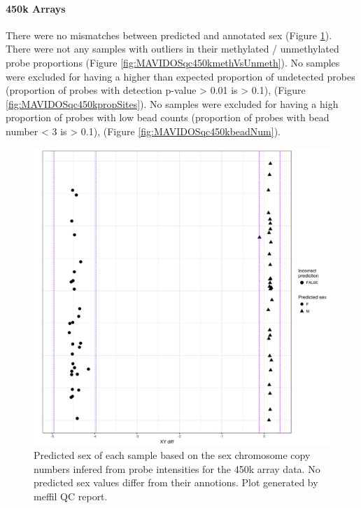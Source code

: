 \documentclass[
]{book}
\begin{document}
\hypertarget{k-arrays}{%
\paragraph{450k Arrays}\label{k-arrays}}

There were no mismatches between predicted and annotated sex (Figure \ref{fig:MAVIDOSqc450ksexMismatch}).
There were not any samples with outliers in their methylated / unmethylated probe proportions (Figure \ref{fig:MAVIDOSqc450kmethVsUnmeth}).
No samples were excluded for having a higher than expected proportion of undetected probes (proportion of probes with detection p-value \textgreater{} 0.01 is \textgreater{} 0.1), (Figure \ref{fig:MAVIDOSqc450kpropSites}).
No samples were excluded for having a high proportion of probes with low bead counts (proportion of probes with bead number \textless{} 3 is \textgreater{} 0.1), (Figure \ref{fig:MAVIDOSqc450kbeadNum}).

\begin{figure}

{\centering \includegraphics[width=0.8\linewidth]{figs/MAVIDOSqc450ksexMismatch} 

}

\caption{Predicted sex of each sample based on the sex chromosome copy numbers infered from probe intensities for the 450k array data. No predicted sex values differ from their annotions. Plot generated by meffil QC report.}\label{fig:MAVIDOSqc450ksexMismatch}
\end{figure}
\end{document}
